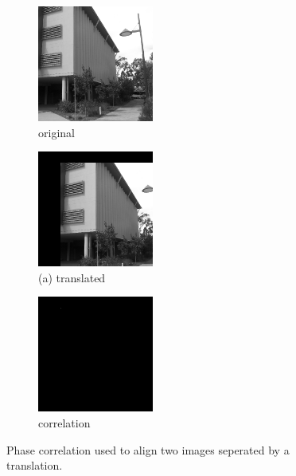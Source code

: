 \begin{figure}[t!] 
        \centering
        \begin{subfigure}[b]{2.0in}
                \includegraphics[width=1.5in]{images/pc/original}
                \caption{original}
                \label{fig:PCSecORY}
        \end{subfigure}%
        \begin{subfigure}[b]{2.0in}
                \includegraphics[width=1.5in]{images/pc/translated}
                \caption{(a) translated}
                \label{fig:PCSectrans}
        \end{subfigure}%
                \begin{subfigure}[b]{2.0in}
                \includegraphics[width=1.5in]{images/pc/phasecorrelation1}
                \caption{correlation}
                \label{fig:PCSecCCPC}
        \end{subfigure}%
       \caption{Phase correlation used to align two images seperated by a translation.}\label{fig:PCSecCC}
\end{figure}

